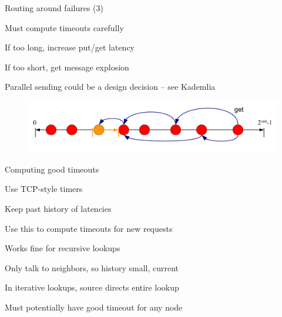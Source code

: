\begin{frame}{Routing around failures (3)}

\BIL
\item Must compute timeouts carefully
\BI
\item If too long, increase put/get latency
\item If too short, get message explosion
\EI
\item Parallel sending could be a design decision -- see Kademlia
\EIL

\begin{figure}
	\includegraphics[width=\textwidth]{figs/10/dht-route-failure3}
\end{figure}

\end{frame}

\begin{frame}{Computing good timeouts}
	
\BIL
\item Use TCP-style timers
	\BI
	\item Keep past history of latencies
	\item Use this to compute timeouts for new requests
	\EI
\item Works fine for recursive lookups
	\BI
	\item Only talk to neighbors, so history small, current
	\EI
\item In iterative lookups, source directs entire lookup
	\BI
	\item Must potentially have good timeout for any node
	\EI
\EIL

\end{frame}

